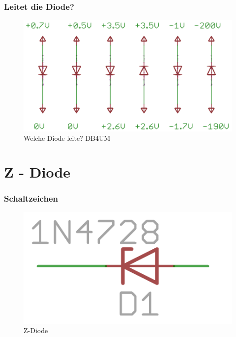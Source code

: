\begin{frame}
    \frametitle{Leitet die Diode?}
    \begin{center}
        \begin{figure}
        \includegraphics[width=1\textwidth,height=.6\textheight]{e12/Leit_Diode.png}
        \caption{Welche Diode leite? DB4UM}
	\end{figure}
	\end{center}
\end{frame}


\section*{Z - Diode}

\begin{frame}
    \frametitle{Schaltzeichen}
    \begin{center}
      \begin{figure}
        \includegraphics[width=.8\textwidth, height=.8\textheight, keepaspectratio]{e12/z-diode.png}
        \caption{Z-Diode}
      \end{figure}
	\end{center}
\end{frame}

